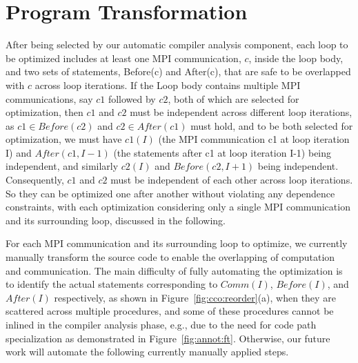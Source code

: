 \section{Program Transformation}
\label{sec-opt}

After being selected by our automatic compiler analysis component, each loop 
to be optimized includes at least one MPI communication, $c$, inside the loop body, and two sets of statements, 
Before(c) and After(c), that are safe to be overlapped with $c$ across loop iterations. If the Loop body contains 
multiple MPI communications, say $c1$ followed by $c2$, both of which are selected for optimization, then $c1$ and $c2$
must be independent across different loop iterations, as $c1 \in Before(c2)$ and $c2 \in After(c1)$ must hold, and to be
both selected  for optimization, we must have $c1(I)$ (the MPI communication c1 at loop iteration I) and $After(c1,I-1)$ (the statements after c1 at loop iteration I-1) being independent, and  similarly $c2(I)$ and $Before(c2,I+1)$  being independent. 
Consequently, $c1$ and $c2$ must be independent of each other across loop iterations. 
So they can be optimized one after another without violating any dependence constraints, with 
each optimization considering only a single MPI communication and its surrounding loop, discussed in the following.

For each MPI communication and its surrounding loop to optimize, we currently manually
transform the source code to enable the overlapping of
computation and communication. The main difficulty of fully automating the optimization is to identify the 
actual statements corresponding to $Comm(I)$, $Before(I)$, and $After(I)$ respectively, as shown in Figure~\ref{fig:cco:reorder}(a),
when they are scattered across multiple procedures,  and some of these procedures cannot be inlined in the compiler analysis phase, e.g., due to 
the need for code path specialization as demonstrated in Figure~\ref{fig:annot:ft}. 
Otherwise, our future work will automate the following currently manually applied steps. 


